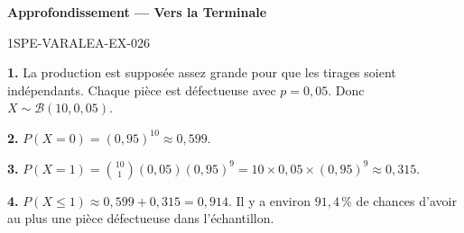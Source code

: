 \begin{center}\textbf{Approfondissement — Vers la Terminale}\end{center}
\begin{corrige}{1SPE-VARALEA-EX-026}

\textbf{1.} La production est supposée assez grande pour que les tirages soient indépendants. Chaque pièce est défectueuse avec $p = 0{,}05$. Donc $X \sim \mathcal{B}(10, 0{,}05)$.

\medskip
\textbf{2.} $P(X=0) = (0{,}95)^{10} \approx 0{,}599$.

\medskip
\textbf{3.} $P(X=1) = \binom{10}{1}(0{,}05)(0{,}95)^9 = 10 \times 0{,}05 \times (0{,}95)^9 \approx 0{,}315$.

\medskip
\textbf{4.} $P(X \leq 1) \approx 0{,}599 + 0{,}315 = 0{,}914$. Il y a environ $91{,}4\,\%$ de chances d'avoir au plus une pièce défectueuse dans l'échantillon.

\end{corrige}

